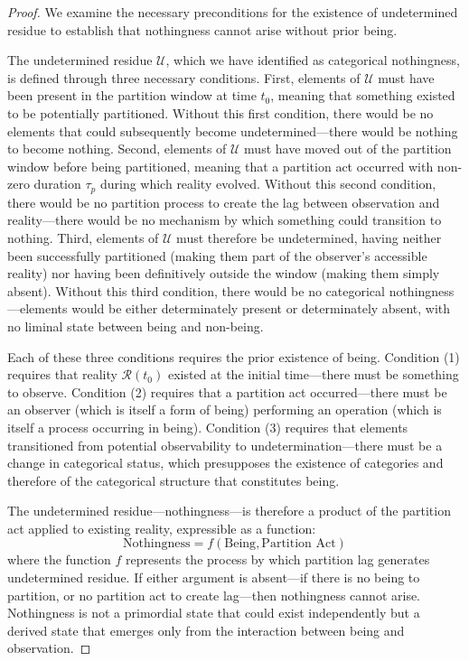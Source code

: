 \documentclass[12pt,a4paper]{article}
\theoremstyle{definition}
\theoremstyle{remark}
\begin{document}
\begin{proof}
We examine the necessary preconditions for the existence of undetermined residue to establish that nothingness cannot arise without prior being.

The undetermined residue $\mathcal{U}$, which we have identified as categorical nothingness, is defined through three necessary conditions. First, elements of $\mathcal{U}$ must have been present in the partition window at time $t_0$, meaning that something existed to be potentially partitioned. Without this first condition, there would be no elements that could subsequently become undetermined—there would be nothing to become nothing. Second, elements of $\mathcal{U}$ must have moved out of the partition window before being partitioned, meaning that a partition act occurred with non-zero duration $\tau_p$ during which reality evolved. Without this second condition, there would be no partition process to create the lag between observation and reality—there would be no mechanism by which something could transition to nothing. Third, elements of $\mathcal{U}$ must therefore be undetermined, having neither been successfully partitioned (making them part of the observer's accessible reality) nor having been definitively outside the window (making them simply absent). Without this third condition, there would be no categorical nothingness—elements would be either determinately present or determinately absent, with no liminal state between being and non-being.

Each of these three conditions requires the prior existence of being. Condition (1) requires that reality $\mathcal{R}(t_0)$ existed at the initial time—there must be something to observe. Condition (2) requires that a partition act occurred—there must be an observer (which is itself a form of being) performing an operation (which is itself a process occurring in being). Condition (3) requires that elements transitioned from potential observability to undetermination—there must be a change in categorical status, which presupposes the existence of categories and therefore of the categorical structure that constitutes being.

The undetermined residue—nothingness—is therefore a product of the partition act applied to existing reality, expressible as a function:
\begin{equation}
    \text{Nothingness} = f(\text{Being}, \text{Partition Act})
\end{equation}
where the function $f$ represents the process by which partition lag generates undetermined residue. If either argument is absent—if there is no being to partition, or no partition act to create lag—then nothingness cannot arise. Nothingness is not a primordial state that could exist independently but a derived state that emerges only from the interaction between being and observation.
\end{proof}
\end{document}

